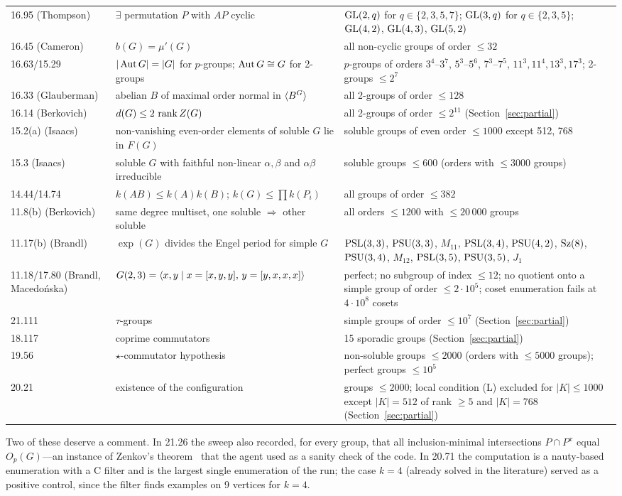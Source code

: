 \begin{longtable}{L{2.6cm}L{5.3cm}L{6.8cm}}
16.95 (Thompson) & $\exists$ permutation $P$ with $AP$ cyclic & $\mathrm{GL}(2,q)$ for $q\in\{2,3,5,7\}$; $\mathrm{GL}(3,q)$ for $q\in\{2,3,5\}$; $\mathrm{GL}(4,2)$, $\mathrm{GL}(4,3)$, $\mathrm{GL}(5,2)$ \\
16.45 (Cameron) & $b(G)=\mu'(G)$ & all non-cyclic groups of order $\le 32$ \\
16.63/15.29 & $|\operatorname{Aut} G|=|G|$ for $p$-groups; $\operatorname{Aut} G\cong G$ for 2-groups & $p$-groups of orders $3^4$--$3^7$, $5^3$--$5^6$, $7^3$--$7^5$, $11^3,11^4,13^3,17^3$; 2-groups $\le 2^7$ \\
16.33 (Glauberman) & abelian $B$ of maximal order normal in $\langle B^G\rangle$ & all 2-groups of order $\le 128$ \\
16.14 (Berkovich) & $d(G)\le 2\,\operatorname{rank} Z(G)$ & all 2-groups of order $\le 2^{11}$ (Section~\ref{sec:partial}) \\
15.2(a) (Isaacs) & non-vanishing even-order elements of soluble $G$ lie in $F(G)$ & soluble groups of even order $\le 1000$ except 512, 768 \\
15.3 (Isaacs) & soluble $G$ with faithful non-linear $\alpha,\beta$ and $\alpha\beta$ irreducible & soluble groups $\le 600$ (orders with $\le 3000$ groups) \\
14.44/14.74 & $k(AB)\le k(A)k(B)$; $k(G)\le\prod k(P_i)$ & all groups of order $\le 382$ \\
11.8(b) (Berkovich) & same degree multiset, one soluble $\Rightarrow$ other soluble & all orders $\le 1200$ with $\le 20\,000$ groups \\
11.17(b) (Brandl) & $\exp(G)$ divides the Engel period for simple $G$ & $\mathrm{PSL}(3,3)$, $\mathrm{PSU}(3,3)$, $M_{11}$, $\mathrm{PSL}(3,4)$, $\mathrm{PSU}(4,2)$, $\mathrm{Sz}(8)$, $\mathrm{PSU}(3,4)$, $M_{12}$, $\mathrm{PSL}(3,5)$, $\mathrm{PSU}(3,5)$, $J_1$ \\
11.18/17.80 (Brandl, Macedońska) & $G(2,3)=\langle x,y\mid x=[x,y,y],\,y=[y,x,x,x]\rangle$ & perfect; no subgroup of index $\le 12$; no quotient onto a simple group of order $\le 2\cdot10^5$; coset enumeration fails at $4\cdot10^8$ cosets \\
21.111 & $\tau$-groups & simple groups of order $\le 10^7$ (Section~\ref{sec:partial}) \\
18.117 & coprime commutators & 15 sporadic groups (Section~\ref{sec:partial}) \\
19.56 & $\star$-commutator hypothesis & non-soluble groups $\le 2000$ (orders with $\le 5000$ groups); perfect groups $\le 10^5$ \\
20.21 & existence of the configuration & groups $\le 2000$; local condition (L) excluded for $|K|\le 1000$ except $|K|=512$ of rank $\ge 5$ and $|K|=768$ (Section~\ref{sec:partial}) \\
\bottomrule
\end{longtable}
\normalsize

Two of these deserve a comment. In 21.26 the sweep also recorded, for every group, that all inclusion-minimal
intersections $P\cap P^x$ equal $O_p(G)$---an instance of Zenkov's theorem~\cite{Zenkov} that the
agent used as a sanity check of the code. In 20.71 the computation is a nauty-based enumeration with a C filter and is the largest single
enumeration of the run; the case $k=4$ (already solved in the literature) served as a positive control, since the
filter finds examples on 9 vertices for $k=4$.
